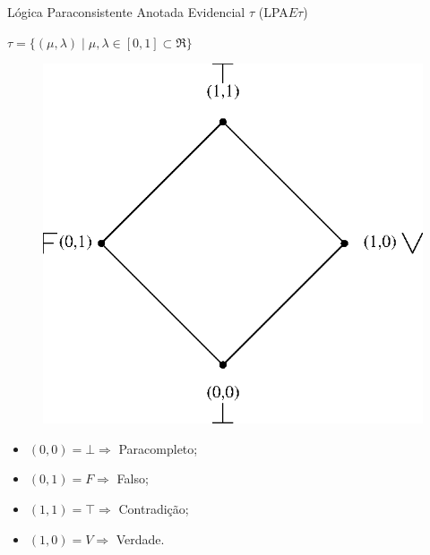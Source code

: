 \begin{frame}{Lógica Paraconsistente Anotada Evidencial $\tau$ (LPA$E\tau$) \tiny \cite{JoaoInacio}}

\begin{block}{
\centering 
$\tau = \{ ( \mu , \lambda ) \mid \mu ,\lambda \in [0,1] \subset \Re \}$
}
\end{block}
\vspace{0.4cm}
\begin{minipage}{0.40\linewidth}
\begin{figure}[!htb]
\center\includegraphics[scale=0.6]{./imagens/C421reticuladoHasse.eps}
\label{fig:reticuladoHasse}
\end{figure}
\end{minipage}
\begin{minipage}{0.55\linewidth}
\center
\begin{itemize}
\item $(0,0) = \bot \Rightarrow $ Paracompleto;
\item $(0,1) = F \Rightarrow $ Falso;
\item $(1,1) = \top \Rightarrow $ Contradição;
\item $(1,0) = V \Rightarrow $ Verdade.
\end{itemize}
\end{minipage}

\end{frame}





